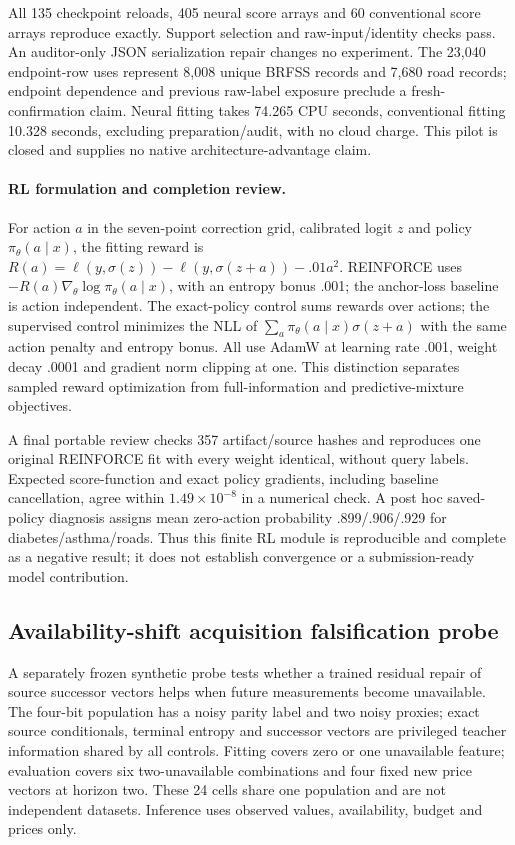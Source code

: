 \documentclass[10pt]{article}
\begin{document}
All 135 checkpoint reloads, 405 neural score arrays and 60 conventional score arrays reproduce exactly. Support selection and raw-input/identity checks pass. An auditor-only JSON serialization repair changes no experiment. The 23,040 endpoint-row uses represent 8,008 unique BRFSS records and 7,680 road records; endpoint dependence and previous raw-label exposure preclude a fresh-confirmation claim. Neural fitting takes 74.265 CPU seconds, conventional fitting 10.328 seconds, excluding preparation/audit, with no cloud charge. This pilot is closed and supplies no native architecture-advantage claim.

\paragraph{RL formulation and completion review.}
For action $a$ in the seven-point correction grid, calibrated logit $z$ and policy $\pi_\theta(a\mid x)$, the fitting reward is $R(a)=\ell(y,\sigma(z))-\ell(y,\sigma(z+a))-.01a^2$. REINFORCE uses $-R(a)\nabla_\theta\log\pi_\theta(a\mid x)$, with an entropy bonus .001; the anchor-loss baseline is action independent. The exact-policy control sums rewards over actions; the supervised control minimizes the NLL of $\sum_a\pi_\theta(a\mid x)\sigma(z+a)$ with the same action penalty and entropy bonus. All use AdamW at learning rate .001, weight decay .0001 and gradient norm clipping at one. This distinction separates sampled reward optimization from full-information and predictive-mixture objectives.

A final portable review checks 357 artifact/source hashes and reproduces one original REINFORCE fit with every weight identical, without query labels. Expected score-function and exact policy gradients, including baseline cancellation, agree within $1.49\times10^{-8}$ in a numerical check. A post hoc saved-policy diagnosis assigns mean zero-action probability .899/.906/.929 for diabetes/asthma/roads. Thus this finite RL module is reproducible and complete as a negative result; it does not establish convergence or a submission-ready model contribution.

\subsection{Availability-shift acquisition falsification probe}
A separately frozen synthetic probe tests whether a trained residual repair of source successor vectors helps when future measurements become unavailable. The four-bit population has a noisy parity label and two noisy proxies; exact source conditionals, terminal entropy and successor vectors are privileged teacher information shared by all controls. Fitting covers zero or one unavailable feature; evaluation covers six two-unavailable combinations and four fixed new price vectors at horizon two. These 24 cells share one population and are not independent datasets. Inference uses observed values, availability, budget and prices only.
\end{document}
